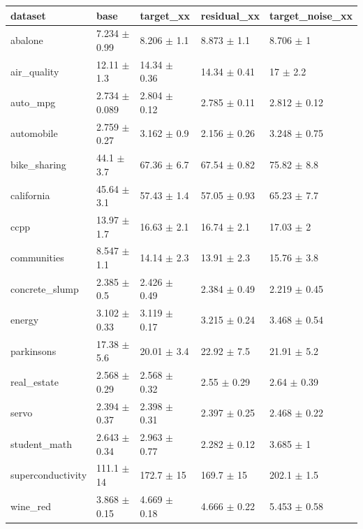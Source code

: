 \begin{tabular}{lllll}
\toprule
dataset & base & target\_xx & residual\_xx & target\_noise\_xx \\
\midrule
abalone & 7.234 $\pm$ 0.99 & 8.206 $\pm$ 1.1 & 8.873 $\pm$ 1.1 & 8.706 $\pm$ 1 \\
air\_quality & 12.11 $\pm$ 1.3 & 14.34 $\pm$ 0.36 & 14.34 $\pm$ 0.41 & 17 $\pm$ 2.2 \\
auto\_mpg & 2.734 $\pm$ 0.089 & 2.804 $\pm$ 0.12 & 2.785 $\pm$ 0.11 & 2.812 $\pm$ 0.12 \\
automobile & 2.759 $\pm$ 0.27 & 3.162 $\pm$ 0.9 & 2.156 $\pm$ 0.26 & 3.248 $\pm$ 0.75 \\
bike\_sharing & 44.1 $\pm$ 3.7 & 67.36 $\pm$ 6.7 & 67.54 $\pm$ 0.82 & 75.82 $\pm$ 8.8 \\
california & 45.64 $\pm$ 3.1 & 57.43 $\pm$ 1.4 & 57.05 $\pm$ 0.93 & 65.23 $\pm$ 7.7 \\
ccpp & 13.97 $\pm$ 1.7 & 16.63 $\pm$ 2.1 & 16.74 $\pm$ 2.1 & 17.03 $\pm$ 2 \\
communities & 8.547 $\pm$ 1.1 & 14.14 $\pm$ 2.3 & 13.91 $\pm$ 2.3 & 15.76 $\pm$ 3.8 \\
concrete\_slump & 2.385 $\pm$ 0.5 & 2.426 $\pm$ 0.49 & 2.384 $\pm$ 0.49 & 2.219 $\pm$ 0.45 \\
energy & 3.102 $\pm$ 0.33 & 3.119 $\pm$ 0.17 & 3.215 $\pm$ 0.24 & 3.468 $\pm$ 0.54 \\
parkinsons & 17.38 $\pm$ 5.6 & 20.01 $\pm$ 3.4 & 22.92 $\pm$ 7.5 & 21.91 $\pm$ 5.2 \\
real\_estate & 2.568 $\pm$ 0.29 & 2.568 $\pm$ 0.32 & 2.55 $\pm$ 0.29 & 2.64 $\pm$ 0.39 \\
servo & 2.394 $\pm$ 0.37 & 2.398 $\pm$ 0.31 & 2.397 $\pm$ 0.25 & 2.468 $\pm$ 0.22 \\
student\_math & 2.643 $\pm$ 0.34 & 2.963 $\pm$ 0.77 & 2.282 $\pm$ 0.12 & 3.685 $\pm$ 1 \\
superconductivity & 111.1 $\pm$ 14 & 172.7 $\pm$ 15 & 169.7 $\pm$ 15 & 202.1 $\pm$ 1.5 \\
wine\_red & 3.868 $\pm$ 0.15 & 4.669 $\pm$ 0.18 & 4.666 $\pm$ 0.22 & 5.453 $\pm$ 0.58 \\
\bottomrule
\end{tabular}
